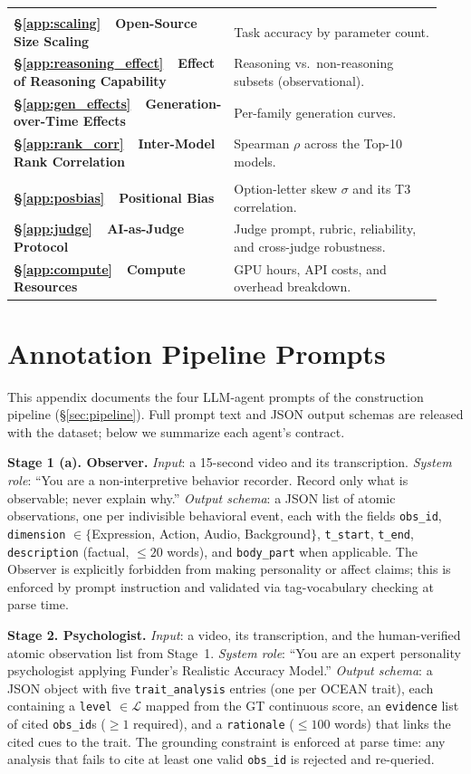 \documentclass{llmxive}
\makeatletter
\providecommand{\tocrow}[3]{\textbf{\S\ref{#1}~~#2} & #3 \\}
\providecommand{\tocgroup}[1]{\addlinespace[6pt]\multicolumn{2}{@{}l}{\textsc{\textbf{#1}}} \\[2pt]}
\makeatother
\begin{document}
\begin{tcolorbox}
\begin{tabular}{@{}p{0.39\linewidth}p{0.55\linewidth}@{}}
\tocgroup{Ecosystem-Level Effects}
\tocrow{app:scaling}{Open-Source Size Scaling}{Task accuracy by parameter count.}
\tocrow{app:reasoning_effect}{Effect of Reasoning Capability}{Reasoning vs.\ non-reasoning subsets (observational).}
\tocrow{app:gen_effects}{Generation-over-Time Effects}{Per-family generation curves.}
\tocrow{app:rank_corr}{Inter-Model Rank Correlation}{Spearman $\rho$ across the Top-10 models.}

\tocgroup{Methodology}
\tocrow{app:posbias}{Positional Bias}{Option-letter skew $\sigma$ and its T3 correlation.}
\tocrow{app:judge}{AI-as-Judge Protocol}{Judge prompt, rubric, reliability, and cross-judge robustness.}
\tocrow{app:compute}{Compute Resources}{GPU hours, API costs, and overhead breakdown.}

\end{tabular}
\end{tcolorbox}



\section{Annotation Pipeline Prompts}
\label{app:prompts}

This appendix documents the four LLM-agent prompts of the construction pipeline (\S\ref{sec:pipeline}). Full prompt text and JSON output schemas are released with the dataset; below we summarize each agent's contract.

\noindent\textbf{Stage 1 (a). Observer.}
\emph{Input}: a 15-second video and its transcription.
\emph{System role}: ``You are a non-interpretive behavior recorder. Record only what is observable; never explain why.''
\emph{Output schema}: a JSON list of atomic observations, one per indivisible behavioral event, each with the fields \texttt{obs\_id}, \texttt{dimension} $\in\!\{$Expression, Action, Audio, Background$\}$, \texttt{t\_start}, \texttt{t\_end}, \texttt{description} (factual, $\leq\!20$ words), and \texttt{body\_part} when applicable. The Observer is explicitly forbidden from making personality or affect claims; this is enforced by prompt instruction and validated via tag-vocabulary checking at parse time.

\noindent\textbf{Stage 2. Psychologist.}
\emph{Input}: a video, its transcription, and the human-verified atomic observation list from Stage~1.
\emph{System role}: ``You are an expert personality psychologist applying Funder's Realistic Accuracy Model.''
\emph{Output schema}: a JSON object with five \texttt{trait\_analysis} entries (one per OCEAN trait), each containing a \texttt{level} $\in\!\mathcal{L}$ mapped from the GT continuous score, an \texttt{evidence} list of cited \texttt{obs\_id}s ($\geq\!1$ required), and a \texttt{rationale} ($\leq\!100$ words) that links the cited cues to the trait. The grounding constraint is enforced at parse time: any analysis that fails to cite at least one valid \texttt{obs\_id} is rejected and re-queried.
\end{document}
